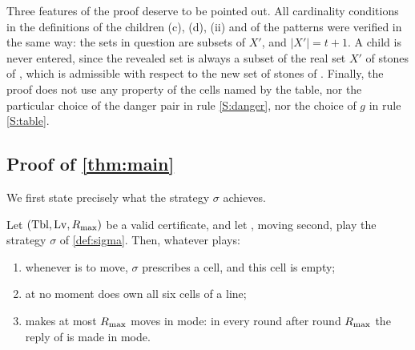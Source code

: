 Three features of the proof deserve to be pointed out. All cardinality conditions in the definitions of the
children \textup{(c)}, \textup{(d)}, \textup{(ii)} and of the patterns were verified in the same way: the
sets in question are subsets of $X'$, and $|X'|=t+1$. A \VOID{} child is never entered, since the revealed set
is always a subset of the real set $X'$ of stones of \Maker, which is admissible with respect to the new set
of stones of \Breaker. Finally, the proof does not use any property of the cells named by the table, nor the
particular choice of the danger pair in rule \ref{S:danger}, nor the choice of $g$ in rule \ref{S:table}.

\subsection{Proof of \texorpdfstring{\cref{thm:main}}{the main theorem}}\label{thm:main-proof}

We first state precisely what the strategy $\sigma$ achieves.

\begin{theorem}\label{thm:sigma}
Let $(\mathrm{Tbl},\mathrm{Lv},R_{\max})$ be a valid certificate, and let \Breaker, moving second, play the strategy $\sigma$ of
\cref{def:sigma}. Then, whatever \Maker{} plays:
\begin{enumerate}[label=\textup{(\alph*)},leftmargin=2.4em]
\item whenever \Breaker{} is to move, $\sigma$ prescribes a cell, and this cell is empty;
\item at no moment does \Maker{} own all six cells of a line;
\item \Breaker{} makes at most $R_{\max}$ moves in \TABLE{} mode: in every round after round $R_{\max}$ the reply
  of \Breaker{} is made in \PAIRING{} mode.
\end{enumerate}
\end{theorem}

